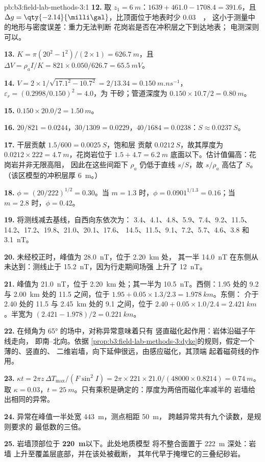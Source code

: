 \begin{solution}{pb:b3:field-lab-methods-3:1}
\textbf{12.} 取 $z_1 = \qty{6}{m}$：$1639 + 461.0 - 1708.4 = 391.6$，且
$\Delta g = \qty{-2.14}{\milli\gal}$，比顶面位于地表时少 \qty{0.03}{\milli\gal}，
这小于测量中的地形与密度误差：重力无法判断
花岗岩是否在冲积层之下到达地表；
电测深则可以。

\textbf{13.} $K = \pi(20^2 - 1^2)/(2\times1) = \qty{626.7}{m}$，且 $\Delta V =
\rho_a I/K = 821\times0.050/626.7 = \qty{65.5}{mV}$。

\textbf{14.} $V = 2\times1/\sqrt{17.1^2 - 10.7^2} = 2/13.34 =
\qty{0.150}{m.ns^{-1}}$，$\varepsilon_r = (0.2998/0.150)^2 = 4.0$，为
干砂；管道深度为 $0.150\times10.7/2 = \qty{0.80}{m}$。

\textbf{15.} $0.150\times20.0/2 = \qty{1.50}{m}$。

\textbf{16.} $20/821 = \num{0.0244}$，$30/1309 = \num{0.0229}$，$40/1684 =
\num{0.0238}$：$S \approx \qty{0.0237}{S}$。

\textbf{17.} 干层贡献 $1.5/600 = \qty{0.0025}{S}$，饱和层
贡献 $\qty{0.0212}{S}$，故其厚度为 $0.0212\times222 =
\qty{4.7}{m}$，花岗岩位于 $1.5 + 4.7 = \qty{6.2}{m}$
底面以下。估计值偏高：花岗岩并非无限高阻，
因此在这些间距下 $\rho_a$ 仍低于直线
$s/S$，故 $s/\rho_a$ 高估了 $S$。（该区模型的冲积层厚
\qty{6}{m}。）

\textbf{18.} $\phi = (20/222)^{1/2} = \num{0.30}$。当 $m = 1.3$ 时，$\phi =
0.0901^{1/1.3} = \num{0.16}$；当 $m = 2.8$ 时，$\phi = \num{0.42}$。

\textbf{19.} 将测线减去基线，自西向东依次为：
3.4、4.1、4.8、5.9、7.4、9.2、11.5、14.2、17.2、19.8、21.0、20.1、17.6、
14.5、11.5、9.1、7.2、5.7、4.6、3.8 和 \qty{3.1}{nT}。

\textbf{20.} 未经校正时，峰值为 \qty{28.0}{nT}，位于 \qty{2.20}{km} 处，
其一半 \qty{14.0}{nT} 在东侧从未达到：测线止于
\qty{15.2}{nT}，因为行走期间场强
上升了 \qty{12}{nT}。

\textbf{21.} 峰值为 \qty{21.0}{nT}，位于 \qty{2.20}{km} 处；其一半为
\qty{10.5}{nT}。西侧：\num{1.95} 处的 \num{9.2} 与
\qty{2.00}{km} 处的 \num{11.5} 之间，位于 $1.95 + 0.05\times1.3/2.3 = \qty{1.978}{km}$。东侧：
介于 \num{2.40} 处的 \num{11.5} 与 \qty{2.45}{km} 处的 \num{9.1} 之间，位于
$2.40 + 0.05\times1.0/2.4 = \qty{2.421}{km}$。半宽为 $(2.421
- 1.978)/2 = \qty{0.221}{km}$。

\textbf{22.} 在倾角为 \ang{65} 的场中，对称异常意味着只有
竖直磁化起作用：岩体沿磁子午线走向，
即南–北向。依据
\cref{prop:b3:field-lab-methods-3:dyke}的规则，假定一个薄的、竖直的、
二维岩墙，向下延伸很远，由感应磁化，其顶端
起着磁荷线的作用。

\textbf{23.} $\kappa t = 2\pi z\,\Delta T_\mathrm{max}/(F\sin^2 I) = 2\pi\times
221\times21.0/(48000\times0.8214) = \qty{0.74}{m}$。取 $\kappa =
0.03$，$t = \qty{25}{m}$。只有乘积是确定的：厚度为两倍而磁化率减半的
岩墙给出相同的异常。

\textbf{24.} 异常在峰值一半处宽 \qty{443}{m}，测点相距 \qty{50}{m}，
跨越异常共有九个读数，是规则要求的
最低数的三倍。

\textbf{25.} 岩墙顶部位于
\textbf{\qty[text-series-to-math=true]{220}{m}}以下。此处地质模型
将不整合面置于 \qty{222}{m} 深处：岩墙
上升至覆盖层底部，并在该处被截断，
其年代早于掩埋它的三叠纪砂岩。
\end{solution}
